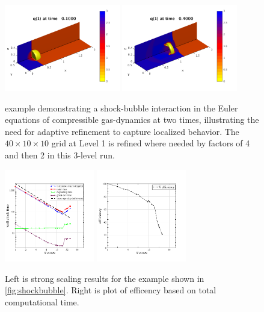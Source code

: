 \begin{figure}[t]
    \centering
    \includegraphics[width=0.45\textwidth]{f1.png}
    \includegraphics[width=0.45\textwidth]{f4.png}
    \caption{\amrclaw example demonstrating a
    shock-bubble interaction in the Euler equations of compressible
    gas-dynamics at two times, illustrating the need for adaptive refinement
    to capture localized behavior. The
    $40\times 10\times 10$ grid at Level 1 is refined where needed
    by factors of 4 and then 2 in this 3-level run.}
    \label{fig:shockbubble}

    \includegraphics[width=0.35\textwidth]{cpuTime.png}
    \includegraphics[width=0.35\textwidth]{efficiency.png}
    \caption{Left is strong scaling results for the \amrclaw example shown in
    \cref{fig:shockbubble}.
    Right is plot of efficency based on total computational time.}
    \label{fig:amr_scaling}
\end{figure}

